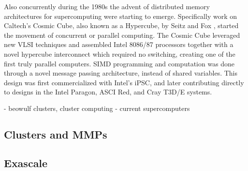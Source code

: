 Also concurrently during the 1980s the advent of distributed memory architectures for supercomputing were starting to emerge. Specifically work on Caltech's Cosmic Cube, also known as a Hypercube, by Seitz and Fox \cite{seitz1985cosmic, fox1987matrix}, started the movement of concurrent or parallel computing.  The Cosmic Cube leveraged new VLSI techniques and assembled Intel 8086/87 processors together with a novel hypercube interconnect which required no switching, creating one of the first truly parallel computers. SIMD programming and computation was done through a novel message passing architecture, instead of shared variables.  This design was first commercialized with Intel's iPSC, and later contributing directly to designs in the Intel Paragon, ASCI Red, and Cray T3D/E systems.  


- beowulf clusters, cluster computing
- current supercomputers


\subsection{Clusters and MMPs}


\subsection{Exascale}


